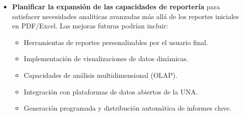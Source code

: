 \begin{itemize}
    \item \textbf{Planificar la expansión de las capacidades de reportería} para
        satisfacer necesidades analíticas avanzadas más allá de los reportes iniciales
        en PDF/Excel. Las mejoras futuras podrían incluir:
        \begin{itemize}
            \item Herramientas de reportes personalizables por el usuario final.
            \item Implementación de visualizaciones de datos dinámicas.
            \item Capacidades de análisis multidimensional (OLAP).
            \item Integración con plataformas de datos abiertos de la UNA.
            \item Generación programada y distribución automática de informes clave.
        \end{itemize}
\end{itemize}

